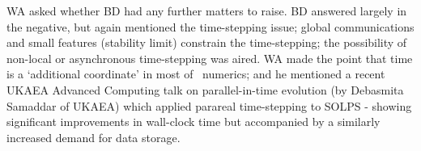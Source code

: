 WA asked whether BD had any further matters to raise.  BD answered largely in 
the negative, but again mentioned the time-stepping issue; global 
communications and small features (stability limit) constrain the 
time-stepping; the possibility of non-local or asynchronous time-stepping was 
aired.  WA made the point that time is a `additional coordinate' in most of \nep \   
numerics; and he mentioned a recent UKAEA Advanced Computing talk on 
parallel-in-time evolution (by Debasmita Samaddar of UKAEA) which applied 
parareal time-stepping to SOLPS - showing significant improvements in wall-clock time
but accompanied by a similarly increased demand for data storage. 

